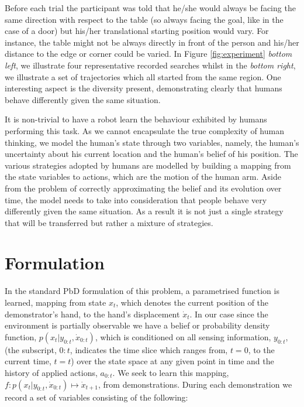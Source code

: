 Before each trial the participant was told that he/she would always be facing the same direction with respect to the table (so always facing the goal, 
like in the case of a door) but his/her translational starting position would vary. 
For instance, the table might not be always directly in front of the person and his/her distance to the edge or 
corner could be varied. In Figure \ref{fig:experiment}
\textit{bottom left}, we illustrate four representative recorded searches whilst in the \textit{bottom right}, we illustrate a set of trajectories 
which all started from the same region. One interesting aspect is the diversity present,
demonstrating clearly that humans behave differently given the same situation.  

It is non-trivial to have a robot learn the behaviour exhibited by humans performing this task. As we cannot encapsulate the true complexity of 
human thinking, we model the human's state through two variables, namely, the human's uncertainty about his current location and the human's  
belief of his position. The various strategies adopted by humans are modelled by building a mapping from the state variables to actions, which are the motion of 
the human arm. Aside from the problem of correctly approximating the belief and its evolution over time, the model needs to take into consideration
that people behave very differently given the same situation. As a result it is not just a single strategy that will be transferred but rather a mixture 
of strategies. 


\section{Formulation} \label{ch3:formulation}

In the standard PbD formulation of this problem, a parametrised function is learned,
mapping from state $x_t$, which denotes the current position of the demonstrator's hand, to  
the hand's displacement $\dot{x}_t$. In our case since the environment is partially observable 
we have a belief or probability density function, $p(x_{t}|y_{0:t},\dot{x}_{0:t})$, which is conditioned on all 
sensing information, $y_{0:t}$, (the subscript, $0:t$, indicates the time slice which ranges from, $t=0$, to 
the current time, $t=t$) over the state space at any given point in time and the history of applied actions, $a_{0:t}$. 
We seek to learn this mapping, $f : p(x_{t}|y_{0:t},\dot{x}_{0:t}) \mapsto \dot{x}_{t+1}$, from demonstrations. During 
each demonstration we record a set of variables consisting of the following:

